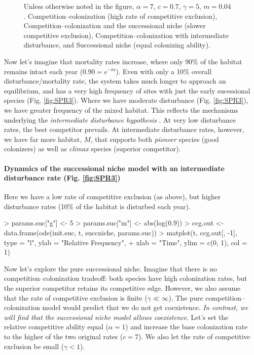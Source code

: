 \begin{figure}[ht]
  \caption[Dynamics of a successional community]{Unless otherwise noted in the figure, $\alpha=7$, $c=0.7$, $\gamma=5$, $m=0.04$.  Competition--colonization (high rate of competitive exclusion),   Competition--colonization and the successional niche (slower competitive exclusion),   Competition--colonization with intermediate disturbance, and  Successional niche (equal colonizing ability). }
\end{figure}

Now let's imagine that mortality rates increase, where only 90\% of the habitat remains intact each year ($0.90=e^{-m}$). Even with only a 10\% overall disturbance/mortality rate, the system takes much longer to approach an equilibrium, and has a very high frequency of sites with just the early sucessional species (Fig. \ref{fig:SPR3}).  Where we have moderate disturbance (Fig. \ref{fig:SPR3}), we have greater frequency of the mixed habitat. This reflects the mechanisms underlying the \emph{intermediate disturbance hypothesis} \cite{Connell1978}. At very low disturbance rates, the best competitor prevails. At intermediate disturbance rates, however, we have far more habitat, $M$, that supports both \emph{pioneer} species (good colonizers) as well as \emph{climax} species (superior competitor).

\medskip \noindent
\begin{boxedminipage}{\linewidth}
  {\footnotesize
\paragraph{Dynamics of the successional niche model with an intermediate disturbance rate (Fig. \ref{fig:SPR3})}
Here we have a low rate of competitive exclusion (as above), but higher disturbance rates (10\% of the habitat is disturbed each year).
\begin{Schunk}
\begin{Sinput}
> params.suc["g"] <- 5
> params.suc["m"] <- abs(log(0.9))
> ccg.out <- data.frame(ode(init.suc, t, succniche, params.suc))
> matplot(t, ccg.out[, -1], type = "l", ylab = "Relative Frequency", 
+     xlab = "Time", ylim = c(0, 1), col = 1)
\end{Sinput}
\end{Schunk}
}
\end{boxedminipage} \medskip

Now let's explore the pure successional niche. Imagine that there is no competition--colonization tradeoff: both species have high colonization rates, but the superior competitor retains its competitive edge. However, we also assume that the rate of competitive exclusion is finite ($\gamma \ll \infty$). The pure competition--colonization model would predict that we do not get coexistence. \emph{In contrast, we will find that the successional niche model allows coexistence}. Let's set the relative competitive ability equal ($\alpha=1$) and increase the base colonization rate to the higher of the two original rates ($c=7$). We also let the rate of competitive exclusion be small ($\gamma < 1$). 

